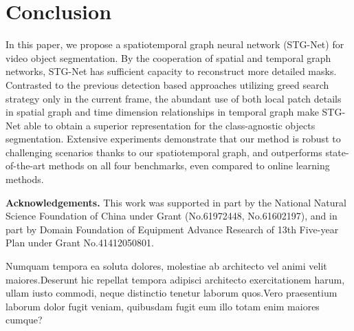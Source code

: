 \documentclass[letterpaper]{article} %
\begin{document}
\section{Conclusion}
In this paper, we propose a spatiotemporal graph neural network (STG-Net) for video object segmentation.
By the cooperation of spatial and temporal graph networks, STG-Net has sufficient capacity to reconstruct more detailed masks.
Contrasted to the previous detection based approaches utilizing greed search strategy only in the current frame, the abundant use of both local patch details in spatial graph and time dimension relationships in temporal graph make STG-Net able to obtain a superior representation for the class-agnostic objects segmentation.
Extensive experiments demonstrate that our method is robust to challenging scenarios thanks to our spatiotemporal graph, and outperforms state-of-the-art methods on all four benchmarks, even compared to online learning methods.


\noindent \textbf{Acknowledgements.} This work was supported in part by the National Natural Science Foundation of China under Grant (No.61972448, No.61602197), and in part by Domain Foundation of Equipment Advance Research of 13th Five-year Plan under Grant No.41412050801.

Numquam tempora ea soluta dolores, molestiae ab architecto vel animi velit maiores.Deserunt hic repellat tempora adipisci architecto exercitationem harum, ullam iusto commodi, neque distinctio tenetur laborum quos.Vero praesentium laborum dolor fugit veniam, quibusdam fugit eum illo totam enim maiores cumque?\clearpage

\end{document}
